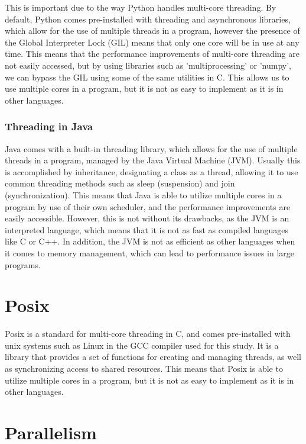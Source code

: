 \documentclass[12pt,a4paper]{article}
\begin{document}
This is important due to the way Python handles multi-core threading. By default, Python comes pre-installed with threading and asynchronous libraries, which allow for the use of multiple threads in a program, however the presence of the Global Interpreter Lock (GIL) means that only one core will be in use at any time. This means that the performance improvements of multi-core threading are not easily accessed, but by using libraries such as 'multiprocessing' or 'numpy', we can bypass the GIL using some of the same utilities in C. This allows us to use multiple cores in a program, but it is not as easy to implement as it is in other languages.

\subsubsection{Threading in Java}

Java comes with a built-in threading library, which allows for the use of multiple threads in a program, managed by the Java Virtual Machine (JVM). Usually this is accomplished by inheritance, designating a class as a thread, allowing it to use common threading methods such as sleep (suspension) and join (synchronization). This means that Java is able to utilize multiple cores in a program by use of their own scheduler, and the performance improvements are easily accessible. However, this is not without its drawbacks, as the JVM is an interpreted language, which means that it is not as fast as compiled languages like C or C++. In addition, the JVM is not as efficient as other languages when it comes to memory management, which can lead to performance issues in large programs. 

\section{Posix}

Posix is a standard for multi-core threading in C, and comes pre-installed with unix systems such as Linux in the GCC compiler used for this study. It is a library that provides a set of functions for creating and managing threads, as well as synchronizing access to shared resources. This means that Posix is able to utilize multiple cores in a program, but it is not as easy to implement as it is in other languages.

\section{Parallelism}
\end{document}
